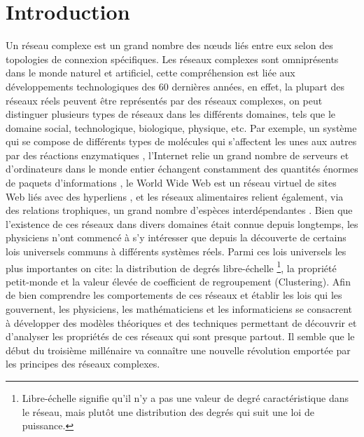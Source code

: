 %
%
\chapter*{Introduction}
Un réseau complexe est un grand nombre des nœuds liés entre eux selon des topologies de connexion spécifiques. Les réseaux complexes sont omniprésents dans le monde naturel et artificiel, cette compréhension est liée aux développements technologiques des $60$ dernières années, en effet,  la plupart des réseaux réels peuvent être représentés par des réseaux complexes, on peut distinguer plusieurs types de réseaux dans les différents domaines, tels que le domaine social, technologique, biologique, physique, etc. Par exemple, un système qui se compose de différents types de molécules qui s'affectent les unes aux autres par des réactions enzymatiques \cite{Je-al2000}, l'Internet  relie un grand nombre de serveurs et d'ordinateurs dans le monde entier échangent constamment des quantités énormes de paquets d'informations \cite{F-al1999}, le World Wide Web est un réseau virtuel de sites Web liés avec des hyperliens \cite{BA1999}, et les réseaux alimentaires relient également, via des relations trophiques, un grand nombre d'espèces interdépendantes \cite{Co-al1990,Pim-al2002}. Bien que l'existence de ces réseaux dans divers domaines était connue depuis longtemps, les physiciens n'ont commencé à s'y intéresser que depuis la découverte de certains lois universels communs à différents systèmes réels. Parmi ces lois universels les plus importantes on cite: 
\textsf{la distribution de degrés} libre-échelle \footnote{ Libre-échelle signifie qu'il n'y a pas une valeur de degré caractéristique dans le réseau, mais plutôt une distribution des degrés qui suit une loi de puissance.},
la propriété \textsf{petit-monde}  
et la valeur élevée de \textsf{coefficient de regroupement} (Clustering). Afin de bien comprendre les comportements de ces réseaux et établir les lois qui les gouvernent, les physiciens, les mathématiciens et les informaticiens se consacrent à développer des modèles théoriques et des techniques permettant de découvrir  et d'analyser les propriétés de ces réseaux qui sont presque partout. Il semble que le début du troisième millénaire va connaître une nouvelle révolution emportée par les principes des réseaux complexes.\\

